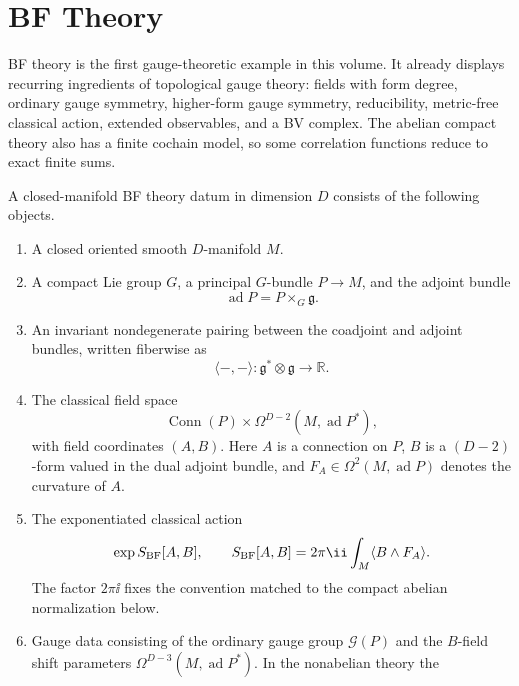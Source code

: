 \chapter{BF Theory}
\label{ch:tqft-bf-theory}

\ConventionsEuclidean

BF theory is the first gauge-theoretic example in this volume.  It already
displays recurring ingredients of topological gauge theory:
fields with form degree, ordinary gauge symmetry, higher-form gauge symmetry,
reducibility, metric-free classical action, extended observables, and a BV
complex.  The abelian compact theory also has a finite cochain model, so some
correlation functions reduce to exact finite sums.

\begin{definition}
\label{def:closed-manifold-bf-theory-datum}
A closed-manifold BF theory datum in dimension \(D\) consists of the following
objects.
\begin{enumerate}[label=\textup{(\roman*)}]
\item A closed oriented smooth \(D\)-manifold \(M\).
\item A compact Lie group \(G\), a principal \(G\)-bundle
      \(P\to M\), and the adjoint bundle
      \[
        \operatorname{ad}P=P\times_G\mathfrak g .
      \]
\item An invariant nondegenerate pairing between the coadjoint and adjoint
      bundles, written fiberwise as
      \[
        \langle-,-\rangle:\mathfrak g^*\otimes\mathfrak g\longrightarrow
        \mathbb R .
      \]
\item The classical field space
      \[
        \operatorname{Conn}(P)\times
        \Omega^{D-2}(M,\operatorname{ad}P^*) ,
      \]
      with field coordinates \((A,B)\).  Here \(A\) is a connection on
      \(P\), \(B\) is a \((D-2)\)-form valued in the dual adjoint bundle, and
      \(F_A\in\Omega^2(M,\operatorname{ad}P)\) denotes the curvature of \(A\).
\item The exponentiated classical action
      \[
        \exp S_{\rm BF}[A,B],
        \qquad
        S_{\rm BF}[A,B]
        =
        2\pi\ii\int_M\langle B\wedge F_A\rangle .
      \]
      The factor \(2\pi\ii\) fixes the convention matched to the compact
      abelian normalization below.
\item Gauge data consisting of the ordinary gauge group \(\mathcal G(P)\) and
      the \(B\)-field shift parameters
      \(\Omega^{D-3}(M,\operatorname{ad}P^*)\).  In the nonabelian theory the

\end{enumerate}
\end{definition}
